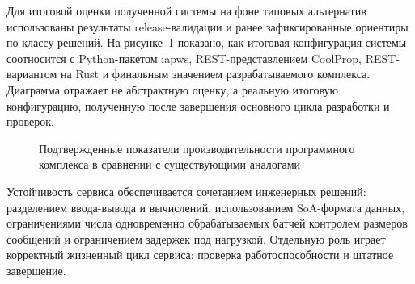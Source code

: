 Для итоговой оценки полученной системы на фоне типовых альтернатив
использованы результаты release-валидации и ранее зафиксированные ориентиры
по классу решений.
На рисунке~\ref{fig:final_performance} показано, как итоговая конфигурация
системы соотносится с Python-пакетом iapws,
REST-представлением CoolProp,
REST-вариантом на Rust
и финальным значением разрабатываемого комплекса.
Диаграмма отражает не абстрактную оценку, а реальную итоговую конфигурацию,
полученную после завершения основного цикла разработки и проверок.

\begin{figure}[htbp]
    \centering
    \caption{Подтвержденные показатели производительности программного комплекса в сравнении с существующими аналогами}
    \label{fig:final_performance}
\end{figure}

Устойчивость сервиса обеспечивается сочетанием инженерных решений:
разделением ввода-вывода и вычислений,
использованием SoA-формата данных,
ограничениями числа одновременно обрабатываемых батчей
контролем размеров сообщений и ограничением задержек под нагрузкой.
Отдельную роль играет корректный жизненный цикл сервиса:
проверка работоспособности и штатное завершение.  
